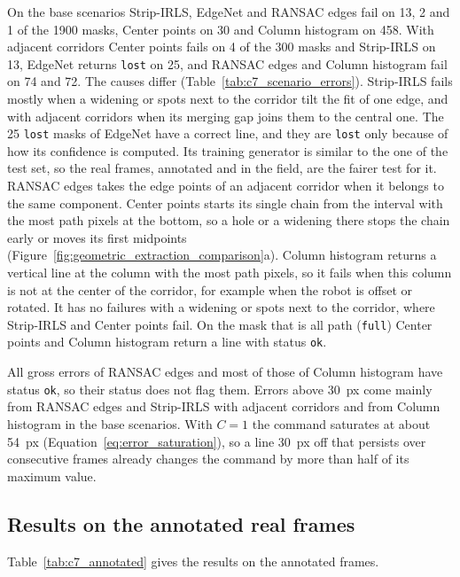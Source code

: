 On the base scenarios Strip-IRLS, EdgeNet and RANSAC edges fail on 13, 2 and 1 of the 1900 masks, Center points on 30 and Column histogram on 458. With adjacent corridors Center points fails on 4 of the 300 masks and Strip-IRLS on 13, EdgeNet returns \texttt{lost} on 25, and RANSAC edges and Column histogram fail on 74 and 72. The causes differ (Table~\ref{tab:c7_scenario_errors}). Strip-IRLS fails mostly when a widening or spots next to the corridor tilt the fit of one edge, and with adjacent corridors when its merging gap joins them to the central one. The 25 \texttt{lost} masks of EdgeNet have a correct line, and they are \texttt{lost} only because of how its confidence is computed. Its training generator is similar to the one of the test set, so the real frames, annotated and in the field, are the fairer test for it. RANSAC edges takes the edge points of an adjacent corridor when it belongs to the same component. Center points starts its single chain from the interval with the most path pixels at the bottom, so a hole or a widening there stops the chain early or moves its first midpoints (Figure~\ref{fig:geometric_extraction_comparison}a). Column histogram returns a vertical line at the column with the most path pixels, so it fails when this column is not at the center of the corridor, for example when the robot is offset or rotated. It has no failures with a widening or spots next to the corridor, where Strip-IRLS and Center points fail. On the mask that is all path (\texttt{full}) Center points and Column histogram return a line with status \texttt{ok}.

All gross errors of RANSAC edges and most of those of Column histogram have status \texttt{ok}, so their status does not flag them. Errors above 30~px come mainly from RANSAC edges and Strip-IRLS with adjacent corridors and from Column histogram in the base scenarios. With $C = 1$ the command saturates at about 54~px (Equation~\eqref{eq:error_saturation}), so a line 30~px off that persists over consecutive frames already changes the command by more than half of its maximum value.

\subsection{Results on the annotated real frames}
\label{subsubsec:geometric_annotated}

Table~\ref{tab:c7_annotated} gives the results on the annotated frames.

